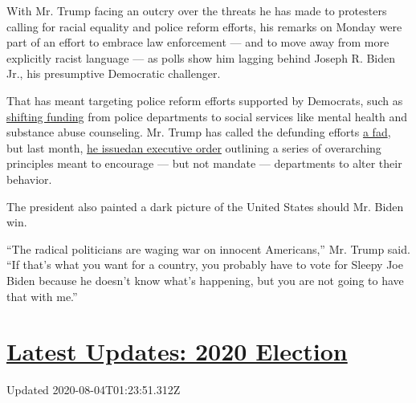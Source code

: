 With Mr. Trump facing an outcry over the threats he has made to
protesters calling for racial equality and police reform efforts, his
remarks on Monday were part of an effort to embrace law enforcement ---
and to move away from more explicitly racist language --- as polls show
him lagging behind Joseph R. Biden Jr., his presumptive Democratic
challenger.

That has meant targeting police reform efforts supported by Democrats,
such as
\href{https://www.cnn.com/2020/06/25/politics/house-police-reform-legislation-vote/index.html}{shifting
funding} from police departments to social services like mental health
and substance abuse counseling. Mr. Trump has called the defunding
efforts
\href{https://www.politico.com/news/2020/07/10/trump-defund-the-police-fad-356442}{a
fad}, but last month,
\href{https://www.whitehouse.gov/presidential-actions/executive-order-safe-policing-safe-communities/}{he
issued}\textbf{\href{https://www.whitehouse.gov/presidential-actions/executive-order-safe-policing-safe-communities/}{}}\href{https://www.whitehouse.gov/presidential-actions/executive-order-safe-policing-safe-communities/}{an
executive order} outlining a series of overarching principles meant to
encourage --- but not mandate --- departments to alter their behavior.

The president also painted a dark picture of the United States should
Mr. Biden win.

``The radical politicians are waging war on innocent Americans,'' Mr.
Trump said. ``If that's what you want for a country, you probably have
to vote for Sleepy Joe Biden because he doesn't know what's happening,
but you are not going to have that with me.''

\hypertarget{latest-updates-2020-election}{%
\section{\texorpdfstring{\href{https://www.nytimes3xbfgragh.onion/2020/08/03/us/elections/biden-vs-trump.html?action=click\&pgtype=Article\&state=default\&region=MAIN_CONTENT_1\&context=storylines_live_updates}{Latest
Updates: 2020
Election}}{Latest Updates: 2020 Election}}\label{latest-updates-2020-election}}

Updated 2020-08-04T01:23:51.312Z

